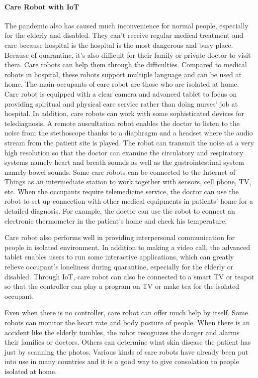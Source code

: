 \documentclass[a4paper]{article}
\begin{document}
\paragraph{Care Robot with IoT}
    The pandemic also has caused much inconvenience for normal people, especially for the elderly and disabled. They can't receive regular medical treatment and care because hospital is the hospital is the most dangerous and busy place. Because of quarantine, it's also difficult for their family or private doctor to visit them. Care robots can help them through the difficulties. Compared to medical robots in hospital, these robots support multiple language and can be used at home. The main occupants of care robot are those who are isolated at home. Care robot is equipped with a clear camera and advanced tablet to focus on providing spiritual and physical care service rather than doing nurses' job at hospital. In addition, care robots can work with some sophisticated devices for telediagnosis. A remote auscultation robot enables the doctor to listen to the noise from the stethoscope thanks to a diaphragm and a headset where the audio stream from the patient site is played\cite{14}. The robot can transmit the noise at a very high resolution so that the doctor can examine the circulatory and respiratory systems namely heart and breath sounds as well as the gastrointestinal system namely bowel sounds. Some care robots can be connected to the Internet of Things as an intermediate station to work together with sensors, cell phone, TV, etc\cite{15}. When the occupants require telemedicine service, the doctor can use the robot to set up connection with other medical equipments in patients' home for a detailed diagnosis. For example, the doctor can use the robot to connect an electronic thermometer in the patient's home and check his temperature. 
\par 
    Care robot also performs well in providing interpersonal communication for people in isolated environment\cite{16}. In addition to making a video call, the advanced tablet enables users to run some interactive applications, which can greatly relieve occupant's loneliness during quarantine, especially for the elderly or disabled. Through IoT, care robot can also be connected to a smart TV or teapot so that the controller can play a program on TV or make tea for the isolated occupant.
\par 
    Even when there is no controller, care robot can offer much help by itself. Some robots can monitor the heart rate and body posture of people. When there is an accident like the elderly tumbles, the robot recognizes the danger and alarms their families or doctors\cite{17}. Others can determine what skin disease the patient has just by scanning the photos\cite{18}. Various kinds of care robots have already been put into use in many countries and it is a good way to give consolation to people isolated at home.
\end{document}
